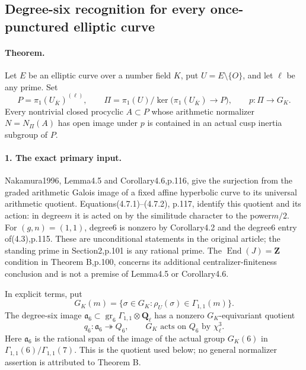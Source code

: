 \subsection*{Degree-six recognition for every once-punctured elliptic curve}

\paragraph{Theorem.}
Let $E$ be an elliptic curve over a number field $K$, put
$U=E\setminus\{O\}$, and let $\ell$ be any prime. Set
\[
 P=\pi_1(U_{\overline K})^{(\ell)},\qquad
 \Pi=\pi_1(U)/\ker\bigl(\pi_1(U_{\overline K})\to P\bigr),
 \qquad p:\Pi\to G_K.
\]
Every nontrivial closed procyclic $A\subset P$ whose arithmetic
normalizer $N=N_\Pi(A)$ has open image under $p$ is contained in an
actual cusp inertia subgroup of $P$.

\paragraph{1. The exact primary input.}
Nakamura1996, Lemma4.5 and Corollary4.6,p.116, give the surjection
from the graded arithmetic Galois image of a fixed affine hyperbolic
curve to its universal arithmetic quotient. Equations(4.7.1)--(4.7.2),
p.117, identify this quotient and its action: in degree$m$ it is acted
on by the similitude character to the power$m/2$. For $(g,n)=(1,1)$,
degree6 is nonzero by Corollary4.2 and the degree6 entry of(4.3),p.115.
These are unconditional statements in the original article; the
standing prime in Section2,p.101 is any rational prime. The
$\operatorname{End}(J)=\mathbf Z$ condition in Theorem B,p.100,
concerns its additional centralizer-finiteness conclusion and is not
a premise of Lemma4.5 or Corollary4.6.

In explicit terms, put
\[
 G_K(m)=\{\sigma\in G_K:\rho_U(\sigma)\in\Gamma_{1,1}(m)\}.
\]
The degree-six image $\mathfrak a_6\subset
\operatorname{gr}_6\Gamma_{1,1}\otimes\mathbf Q_\ell$ has a nonzero
$G_K$-equivariant quotient
\[
 q_6:\mathfrak a_6\twoheadrightarrow Q_6,
 \qquad G_K\text{ acts on }Q_6\text{ by }\chi_\ell^3.
\]
Here $\mathfrak a_6$ is the rational span of the image of the actual
group $G_K(6)$ in $\Gamma_{1,1}(6)/\Gamma_{1,1}(7)$.
This is the quotient used below; no general normalizer assertion is
attributed to Theorem B.

